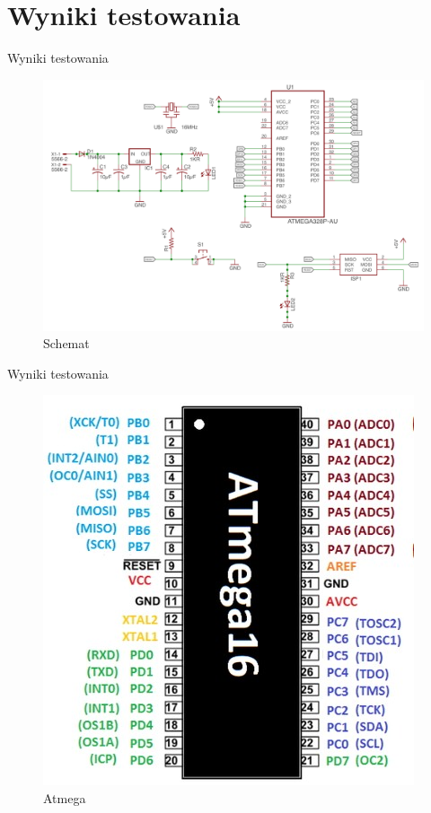 \documentclass[12pt,a4paper]{beamer}
\begin{document}
\section{Wyniki testowania}
\begin{frame}{Wyniki testowania}
    \begin{figure}[h]
    \centering
    \includegraphics[scale=0.2]{atmega_schemat.png}
    \caption{Schemat}
    \label{fig:my_label}
\end{figure}
\end{frame}
\begin{frame}{Wyniki testowania}
    \begin{figure}[h]
    \centering
    \includegraphics[scale=1]{atmega16.jpg}
    \caption{Atmega}
    \label{fig:my_label}
    \end{figure}
\end{frame}
\end{document}

